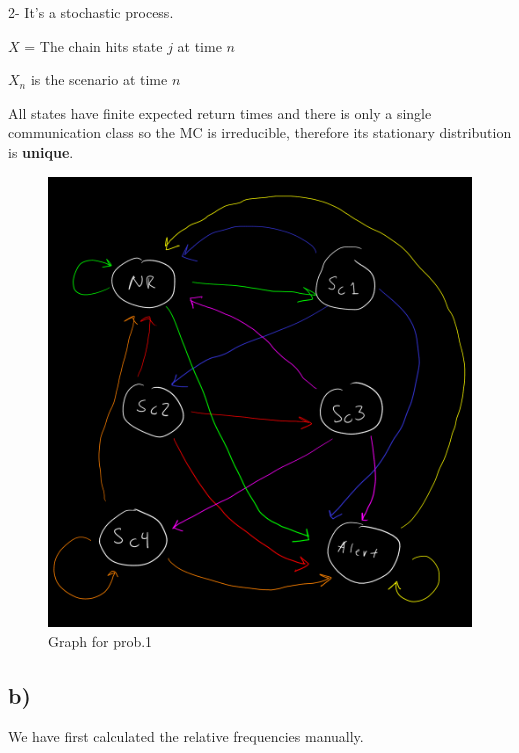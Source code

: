 \documentclass[
]{article}
\begin{document}
2- It's a stochastic process.

\(X\) = The chain hits state \(j\) at time \(n\)

\(X_{n}\) is the scenario at time \(n\)

All states have finite expected return times and there is only a single
communication class so the MC is irreducible, therefore its stationary
distribution is \textbf{unique}.

\begin{figure}
\centering
\includegraphics{./grafo1.png}
\caption{Graph for prob.1}
\end{figure}

\newpage

\hypertarget{b}{%
\subsection{b)}\label{b}}

We have first calculated the relative frequencies manually.
\end{document}
